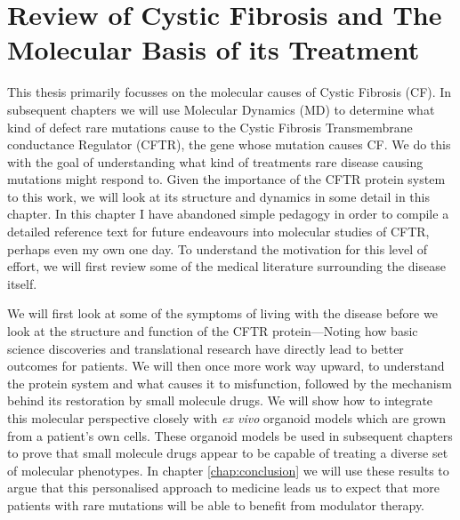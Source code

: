 \chapter{Review of Cystic Fibrosis and The Molecular Basis of its Treatment}
\label{chap:cftr}
\newpage





This thesis primarily focusses on the molecular causes of Cystic Fibrosis (CF). In subsequent chapters we will use Molecular Dynamics (MD) to determine what kind of defect rare mutations cause to the Cystic Fibrosis Transmembrane conductance Regulator (CFTR), the gene whose mutation causes CF. We do this with the goal of understanding what kind of treatments rare disease causing mutations might respond to. Given the importance of the CFTR protein system to this work, we will look at its structure and dynamics in some detail in this chapter. In this chapter I have abandoned simple pedagogy in order to compile a detailed reference text for future endeavours into molecular studies of CFTR, perhaps even my own one day. To understand the motivation for this level of effort, we will first review some of the medical literature surrounding the disease itself. 

We will first look at some of the symptoms of living with the disease before we look at the structure and function of the CFTR protein---Noting how basic science discoveries and translational research have directly lead to better outcomes for patients. We will then once more work way upward, to understand the protein system and what causes it to misfunction, followed by the mechanism behind its restoration by small molecule drugs. We will show how to integrate this molecular perspective closely with \textit {ex vivo} organoid models which are grown from a patient's own cells. These organoid models be used in subsequent chapters to prove that small molecule drugs appear to be capable of treating a diverse set of molecular phenotypes. In chapter \ref{chap:conclusion} we will use these results to argue that this personalised approach to medicine leads us to expect that more patients with rare mutations will be able to benefit from modulator therapy. 

